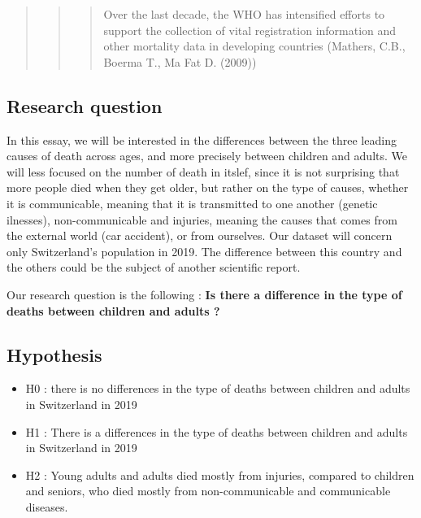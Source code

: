 \documentclass[
]{article}
\begin{document}
\begin{quote}
\begin{quote}
\begin{quote}
Over the last decade, the WHO has intensified efforts to support the
collection of vital registration information and other mortality data in
developing countries (Mathers, C.B., Boerma T., Ma Fat D. (2009))
\end{quote}
\end{quote}
\end{quote}

\hypertarget{research-question}{%
\subsection{Research question}\label{research-question}}

In this essay, we will be interested in the differences between the
three leading causes of death across ages, and more precisely between
children and adults. We will less focused on the number of death in
itslef, since it is not surprising that more people died when they get
older, but rather on the type of causes, whether it is communicable,
meaning that it is transmitted to one another (genetic ilnesses),
non-communicable and injuries, meaning the causes that comes from the
external world (car accident), or from ourselves. Our dataset will
concern only Switzerland's population in 2019. The difference between
this country and the others could be the subject of another scientific
report.

Our research question is the following : \textbf{Is there a difference
in the type of deaths between children and adults ?}

\hypertarget{hypothesis}{%
\subsection{Hypothesis}\label{hypothesis}}

\begin{itemize}
\item
  H0 : there is no differences in the type of deaths between children
  and adults in Switzerland in 2019
\item
  H1 : There is a differences in the type of deaths between children and
  adults in Switzerland in 2019
\item
  H2 : Young adults and adults died mostly from injuries, compared to
  children and seniors, who died mostly from non-communicable and
  communicable diseases.
\end{itemize}
\end{document}

